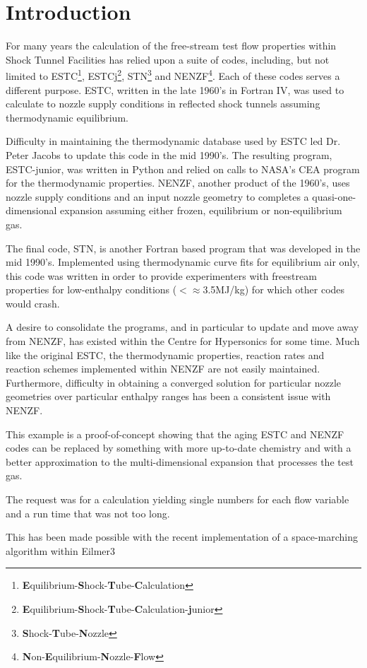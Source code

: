 
\newpage
\section{Introduction}
\label{chapter-introduction}
%
For many years the calculation of the free-stream test flow properties within Shock Tunnel Facilities has relied upon a suite of codes, including, but not limited to ESTC\footnote{\textbf{E}quilibrium-\textbf{S}hock-\textbf{T}ube-\textbf{C}alculation}\cite{McIntosh_1968}, ESTCj\footnote{\textbf{E}quilibrium-\textbf{S}hock-\textbf{T}ube-\textbf{C}alculation-\textbf{j}unior}, STN\footnote{\textbf{S}hock-\textbf{T}ube-\textbf{N}ozzle}\cite{} and NENZF\footnote{\textbf{N}on-\textbf{E}quilibrium-\textbf{N}ozzle-\textbf{F}low}\cite{Lordi_1966}. Each of these codes serves a different purpose. ESTC, written in the late 1960's in Fortran IV, was used to calculate to nozzle supply conditions in reflected shock tunnels assuming thermodynamic equilibrium. 

Difficulty in maintaining the thermodynamic database used by ESTC led Dr. Peter Jacobs to update this code in the mid 1990's. The resulting program, ESTC-junior, was written in Python and relied on calls to NASA's CEA\cite{Gordon_1994} program for the thermodynamic properties. NENZF, another product of the 1960's, uses nozzle supply conditions and an input nozzle geometry to completes a quasi-one-dimensional expansion assuming either frozen, equilibrium or non-equilibrium gas. 

The final code, STN, is another Fortran based program that was developed in the mid 1990's. Implemented using thermodynamic curve fits for equilibrium air only, this code was written in order to provide experimenters with freestream properties for low-enthalpy conditions ($<\approx$3.5MJ/kg) for which other codes would crash. 

A desire to consolidate the programs, and in particular to update and move away from NENZF, has existed within the Centre for Hypersonics for some time. Much like the original ESTC, the thermodynamic properties, reaction rates and reaction schemes implemented within NENZF are not easily maintained. Furthermore, difficulty in obtaining a converged solution for particular nozzle geometries over particular enthalpy ranges has been a consistent issue with NENZF. 


This example is a proof-of-concept showing that the aging ESTC and NENZF codes
can be replaced by something with more up-to-date chemistry and with a better
approximation to the multi-dimensional expansion that processes the test gas.

The request was for a calculation yielding single numbers for each flow variable
and a run time that was not too long.


This has been made possible with the recent implementation of a space-marching algorithm within Eilmer3\cite{}
